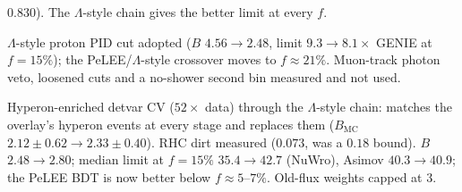 \documentclass[11pt,a4paper]{article}
\newcommand{\Lam}{\ensuremath{\Lambda}}
\begin{document}
\begin{description}
        0.830). The \Lam-style chain gives the better limit at every $f$.
  \item[2026-11-01] \Lam-style proton PID cut adopted ($B$ $4.56\to2.48$, limit
        $9.3\to8.1\times$ GENIE at $f=15\%$); the PeLEE/\Lam-style crossover moves to
        $f\approx21\%$. Muon-track photon veto, loosened cuts and a no-shower second bin
        measured and not used.
  \item[2026-11-06] Hyperon-enriched detvar CV ($52\times$ data) through the \Lam-style chain:
        matches the overlay's hyperon events at every stage and replaces them ($B_{\mathrm{MC}}$
        $2.12\pm0.62\to2.33\pm0.40$). RHC dirt measured ($0.073$, was a $0.18$ bound). $B$
        $2.48\to2.80$; median limit at $f=15\%$ $35.4\to42.7$ (NuWro), Asimov $40.3\to40.9$;
        the PeLEE BDT is now better below $f\approx5$--$7\%$. Old-flux weights capped at 3.
\end{description}
\end{document}
